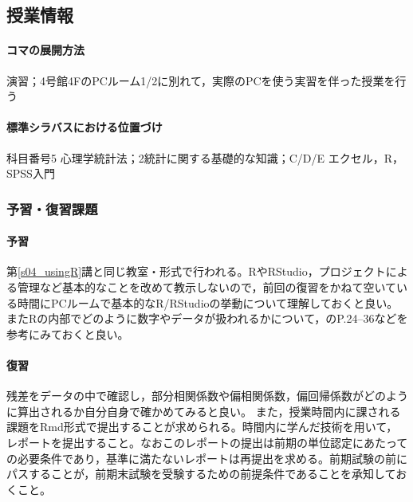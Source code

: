 \subsection{授業情報}
\paragraph{コマの展開方法}
演習；4号館4FのPCルーム1/2に別れて，実際のPCを使う実習を伴った授業を行う
\paragraph{標準シラバスにおける位置づけ}
科目番号5 心理学統計法；2統計に関する基礎的な知識；C/D/E エクセル，R，SPSS入門
\subsubsection{予習・復習課題}
\paragraph{予習}
第\ref{s04_usingR}講と同じ教室・形式で行われる。RやRStudio，プロジェクトによる管理など基本的なことを改めて教示しないので，前回の復習をかねて空いている時間にPCルームで基本的なR/RStudioの挙動について理解しておくと良い。またRの内部でどのように数字やデータが扱われるかについて，\textcite{kosugi2019}のP.24--36などを参考にみておくと良い。
\paragraph{復習}
残差をデータの中で確認し，部分相関係数や偏相関係数，偏回帰係数がどのように算出されるか自分自身で確かめてみると良い。
また，授業時間内に課される課題をRmd形式で提出することが求められる。時間内に学んだ技術を用いて，レポートを提出すること。なおこのレポートの提出は前期の単位認定にあたっての必要条件であり，基準に満たないレポートは再提出を求める。前期試験の前にパスすることが，前期末試験を受験するための前提条件であることを承知しておくこと。


